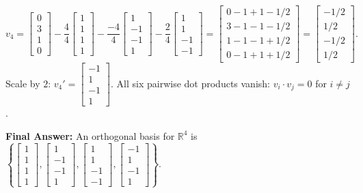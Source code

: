 \documentclass[11pt, letterpaper]{article}
\theoremstyle{definition}
\theoremstyle{remark}
\begin{document}
\begin{enumerate}[label=\textbf{Step \arabic*:}]
\[        v_4 = \begin{bmatrix} 0 \\ 3 \\ 1 \\ 0 \end{bmatrix} - \frac{4}{4}\begin{bmatrix} 1 \\ 1 \\ 1 \\ 1 \end{bmatrix} - \frac{-4}{4}\begin{bmatrix} 1 \\ -1 \\ -1 \\ 1 \end{bmatrix} - \frac{2}{4}\begin{bmatrix} 1 \\ 1 \\ -1 \\ -1 \end{bmatrix}
        = \begin{bmatrix} 0 - 1 + 1 - 1/2 \\ 3 - 1 - 1 - 1/2 \\ 1 - 1 - 1 + 1/2 \\ 0 - 1 + 1 + 1/2 \end{bmatrix}
        = \begin{bmatrix} -1/2 \\ 1/2 \\ -1/2 \\ 1/2 \end{bmatrix}.
    \]
    Scale by $2$: $v_4' = \begin{bmatrix} -1 \\ 1 \\ -1 \\ 1 \end{bmatrix}$. All six pairwise dot products vanish: $v_i \cdot v_j = 0$ for $i \neq j$.
\end{enumerate}
\textbf{Final Answer:} An orthogonal basis for $\mathbb{R}^4$ is $\left\{ \begin{bmatrix} 1 \\ 1 \\ 1 \\ 1 \end{bmatrix}, \begin{bmatrix} 1 \\ -1 \\ -1 \\ 1 \end{bmatrix}, \begin{bmatrix} 1 \\ 1 \\ -1 \\ -1 \end{bmatrix}, \begin{bmatrix} -1 \\ 1 \\ -1 \\ 1 \end{bmatrix} \right\}$.
\end{document}
